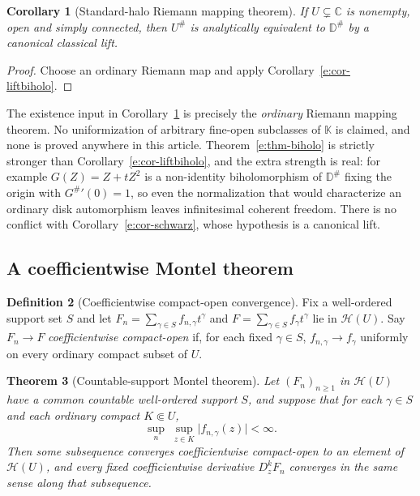 \documentclass[11pt,a4paper]{article}
\numberwithin{equation}{section}
\newtheorem{theorem}{Theorem}[section]
\newtheorem{corollary}[theorem]{Corollary}
\theoremstyle{definition}
\newtheorem{definition}[theorem]{Definition}
\theoremstyle{remark}
\theoremstyle{plain}
\newcommand{\K}{\mathbb K}
\newcommand{\CC}{\mathbb C}
\newcommand{\tm}{t}
\newcommand{\halo}[1]{#1^{\#}}
\newcommand{\ev}[1]{#1^{\#}}
\newcommand{\Hc}{\mathcal H}
\newcommand{\abs}[1]{\lvert #1\rvert}
\begin{document}
\begin{corollary}[Standard-halo Riemann mapping theorem]
\label{e:cor-riemannmap}
If $U\subsetneq\CC$ is nonempty, open and simply connected, then $\halo U$
is analytically equivalent to $\halo{\mathbb D}$ by a canonical classical
lift.
\end{corollary}

\begin{proof}
Choose an ordinary Riemann map and apply
Corollary~\ref{e:cor-liftbiholo}.
\end{proof}

The existence input in Corollary~\ref{e:cor-riemannmap} is precisely the
\emph{ordinary} Riemann mapping theorem.  No uniformization of arbitrary
fine-open subclasses of $\K$ is claimed, and none is proved anywhere in
this article.  Theorem~\ref{e:thm-biholo} is strictly stronger than
Corollary~\ref{e:cor-liftbiholo}, and the extra strength is real: for
example $G(Z)=Z+\tm Z^2$ is a non-identity biholomorphism of
$\halo{\mathbb D}$ fixing the origin with $\ev G{}'(0)=1$, so even the
normalization that would characterize an ordinary disk automorphism leaves
infinitesimal coherent freedom.  There is no conflict with
Corollary~\ref{e:cor-schwarz}, whose hypothesis is a canonical lift.

\subsection{A coefficientwise Montel theorem}\label{e:sec-montel}

\begin{definition}[Coefficientwise compact-open convergence]
\label{e:def-coefconv}
Fix a well-ordered support set $S$ and let
$F_n=\sum_{\gamma\in S}f_{n,\gamma}\tm^\gamma$ and
$F=\sum_{\gamma\in S}f_\gamma\tm^\gamma$ lie in $\Hc(U)$.  Say
$F_n\to F$ \emph{coefficientwise compact-open} if, for each fixed
$\gamma\in S$, $f_{n,\gamma}\to f_\gamma$ uniformly on every ordinary
compact subset of $U$.
\end{definition}

\begin{theorem}[Countable-support Montel theorem]\label{e:thm-montel}
Let $(F_n)_{n\ge1}$ in $\Hc(U)$ have a common \emph{countable}
well-ordered support $S$, and suppose that for each $\gamma\in S$ and each
ordinary compact $K\Subset U$,
\[
 \sup_n\;\sup_{z\in K}\abs{f_{n,\gamma}(z)}<\infty .
\]
Then some subsequence converges coefficientwise compact-open to an element
of $\Hc(U)$, and every fixed coefficientwise derivative $D_z^kF_n$
converges in the same sense along that subsequence.
\end{theorem}
\end{document}
